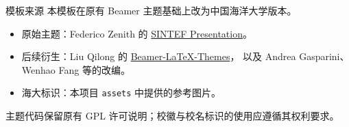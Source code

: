 \documentclass{beamer}
\newcommand{\hrefcol}[2]{\textcolor{oucblue}{\href{#1}{#2}}}
\begin{document}
\begin{frame}{模板来源}
本模板在原有 Beamer 主题基础上改为中国海洋大学版本。
\medskip
\begin{itemize}
  \item 原始主题：Federico Zenith 的
    \hrefcol{https://www.overleaf.com/latex/templates/sintef-presentation/jhbhdffczpnx}{SINTEF Presentation}。
  \item 后续衍生：Liu Qilong 的
    \hrefcol{https://github.com/TOB-KNPOB/Beamer-LaTeX-Themes}{Beamer-LaTeX-Themes}，
    以及 Andrea Gasparini、Wenhao Fang 等的改编。
  \item 海大标识：本项目 \texttt{assets} 中提供的参考图片。
\end{itemize}
\medskip
主题代码保留原有 GPL 许可说明；校徽与校名标识的使用应遵循其权利要求。
\end{frame}

\backmatter
\end{document}
